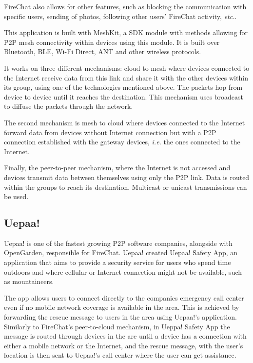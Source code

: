FireChat also allows for other features, such as blocking the communication with specific users, sending of photos, following other users' FireChat activity, \textit{etc.}.

This application is built with MeshKit, a \gls{SDK} module with methods allowing for P2P mesh connectivity within devices using this module. It is built over Bluetooth, \gls{BLE}, Wi-Fi Direct, ANT and other wireless protocols.

It works on three different mechanisms: cloud to mesh where devices connected to the Internet receive data from this link and share it with the other devices within its group, using one of the technologies mentioned above. The packets hop from device to device until it reaches the destination. This mechanism uses broadcast to diffuse the packets through the network.

The second mechanism is mesh to cloud where devices connected to the Internet forward data from devices without Internet connection but with a P2P connection established with the gateway devices, \textit{i.e.} the ones connected to the Internet.

Finally, the peer-to-peer mechanism, where the Internet is not accessed and devices transmit data between themselves using only the P2P link. Data is routed within the groups to reach its destination. Multicast or unicast transmissions can be used.

\subsection{Uepaa!}
\label{subsec:uepaa}

Uepaa! is one of the fastest growing P2P software companies, alongside with OpenGarden, responsible for FireChat. Uepaa! created Uepaa! Safety App, an application that aims to provide a security service for users who spend time outdoors and where cellular or Internet connection might not be available, such as mountaineers.

The app allows users to connect directly to the companies emergency call center even if no mobile network coverage is available in the area. This is achieved by forwarding the rescue message to users in the area using Uepaa!'s application. Similarly to FireChat's peer-to-cloud mechanism, in Ueppa! Safety App the message is routed through devices in the are until a device has a connection with either a mobile network or the Internet, and the rescue message, with the user's location is then sent to Uepaa!'s call center where the user can get assistance.

